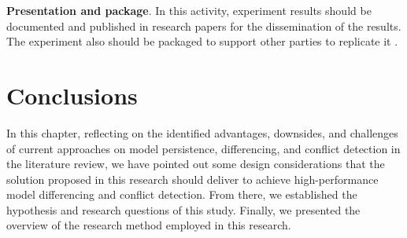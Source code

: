 \textbf{Presentation and package}. In this activity, experiment results should be documented and published in research papers for the dissemination of the results. The experiment also should be packaged to support other parties to replicate it \cite{DBLP:books/daglib/0029933/Wohlin}. 

\section{Conclusions}
\label{sec:conclusions_2b}
In this chapter, reflecting on the identified advantages, downsides, and challenges of current approaches on model persistence, differencing, and conflict detection in the literature review, we have pointed out some design considerations that the solution proposed in this research should deliver to achieve high-performance model differencing and conflict detection. From there, we established the hypothesis and research questions of this study. Finally, we presented the overview of the research method employed in this research. 